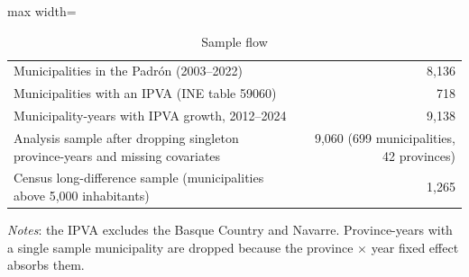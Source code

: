 \begin{table}[!htbp]\centering\small
\caption{Sample flow}\label{tab:flow}
\begin{adjustbox}{max width=\linewidth}\begin{tabular}{lr}\toprule
Municipalities in the Padrón (2003--2022) & 8,136\\
Municipalities with an IPVA (INE table 59060) & 718\\
Municipality-years with IPVA growth, 2012--2024 & 9,138\\
Analysis sample after dropping singleton province-years and missing covariates & 9,060 (699 municipalities, 42 provinces)\\
Census long-difference sample (municipalities above 5,000 inhabitants) & 1,265\\
\bottomrule\end{tabular}\end{adjustbox}
\begin{minipage}{0.9\linewidth}\footnotesize\vspace{4pt}\textit{Notes}: the IPVA excludes the Basque Country and Navarre. Province-years with a single sample municipality are dropped because the province $\times$ year fixed effect absorbs them.\end{minipage}\end{table}